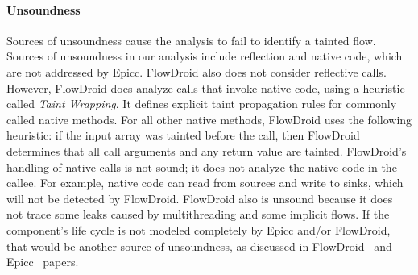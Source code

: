 {\paragraph{Unsoundness}\label{subsec:unsoundness}
Sources of unsoundness cause the analysis to fail to identify a tainted
flow.
Sources of unsoundness in our analysis include reflection and native
code, which are not addressed by Epicc. FlowDroid also does not
consider reflective calls. %
However, FlowDroid does analyze calls that invoke native code, using a heuristic
called {\em Taint Wrapping}.
It defines explicit taint propagation rules for commonly called native
methods. For all other native methods, FlowDroid uses the following heuristic:
if the input array was tainted before the call, then FlowDroid determines that all call arguments and any return
 value are tainted. 
%
FlowDroid's handling of native calls is not
sound; it does not analyze the native code in the callee. 
For example, native code can read from sources and write to sinks, which
will not be detected by FlowDroid.
%
FlowDroid also is unsound because it does not trace some leaks caused by multithreading and some implicit flows.
If the component's life cycle is not modeled completely by Epicc and/or FlowDroid, that would be another source of unsoundness, as discussed in FlowDroid~\cite{FlowDroid-PLDI-2014} and Epicc~\cite{octeau2013effective} papers.%

}

